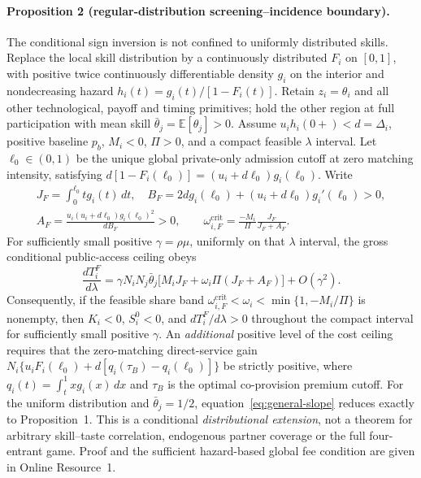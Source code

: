 \paragraph{Proposition 2 (regular-distribution screening--incidence boundary).}
\label{prop:general-distribution}
The conditional sign inversion is not confined to uniformly distributed
skills. Replace the local skill distribution by a continuously distributed
$F_i$ on $[0,1]$, with positive twice continuously differentiable density
$g_i$ on the interior and nondecreasing hazard
$h_i(t)=g_i(t)/[1-F_i(t)]$. Retain $z_i=\theta_i$ and
all other technological, payoff and timing primitives; hold the other
region at full participation with mean skill
$\bar\theta_j=\mathbb E[\theta_j]>0$.
Assume $u_i h_i(0+)<d=\Delta_i$, positive baseline $p_b$,
$M_i<0$, $\Pi>0$, and a compact feasible $\lambda$ interval.
Let $\ell_0\in(0,1)$ be the unique global private-only admission cutoff
at zero matching intensity, satisfying
$d[1-F_i(\ell_0)]=(u_i+d\ell_0)g_i(\ell_0)$. Write
\begin{equation}
 \begin{gathered}
 J_F=\int_0^{\ell_0}t g_i(t)\,dt,\quad
 B_F=2d g_i(\ell_0)+(u_i+d\ell_0)g_i'(\ell_0)>0,\\
 A_F=\frac{u_i(u_i+d\ell_0)g_i(\ell_0)^2}{dB_F}>0,
 \qquad
 \omega_{i,F}^{\mathrm{crit}}
   =\frac{-M_i}{\Pi}\frac{J_F}{J_F+A_F}.
 \end{gathered}\label{eq:general-share-band}
\end{equation}
For sufficiently small positive $\gamma=\rho\mu$, uniformly on that
$\lambda$ interval, the gross conditional public-access ceiling obeys
\begin{equation}
 \frac{dT_i^F}{d\lambda}
 =\gamma N_iN_j\bar\theta_j
   \bigl[M_i J_F+\omega_i\Pi(J_F+A_F)\bigr]
   +O(\gamma^2).
 \label{eq:general-slope}
\end{equation}
Consequently, if the feasible share band
$\omega_{i,F}^{\mathrm{crit}}<\omega_i<\min\{1,-M_i/\Pi\}$
is nonempty, then $K_i<0$, $S_i^0<0$, and
$dT_i^F/d\lambda>0$ throughout the compact interval for sufficiently
small positive $\gamma$. An \emph{additional} positive level of the
cost ceiling requires that the zero-matching direct-service gain
$N_i\{u_iF_i(\ell_0)+d[q_i(\tau_B)-q_i(\ell_0)]\}$ be strictly
positive, where $q_i(t)=\int_t^1xg_i(x)\,dx$ and $\tau_B$ is the
optimal co-provision premium cutoff. For the uniform distribution and
$\bar\theta_j=1/2$, equation~\eqref{eq:general-slope} reduces exactly
to Proposition~1. This is a conditional \emph{distributional extension},
not a theorem for arbitrary skill--taste correlation, endogenous partner
coverage or the full four-entrant game. Proof and the sufficient
hazard-based global fee condition are given in Online Resource~1.

